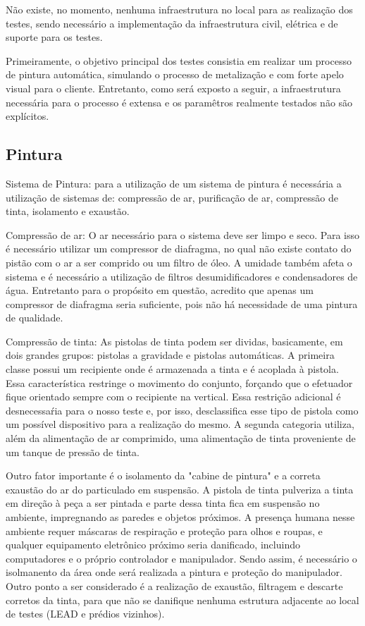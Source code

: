 Não existe, no momento, nenhuma infraestrutura no local para as
realização dos testes, sendo necessário a implementação da infraestrutura civil,
elétrica e de suporte para os testes.

Primeiramente, o objetivo principal dos testes consistia em realizar um processo
de pintura automática, simulando o processo de metalização e com forte apelo
visual para o cliente. Entretanto, como será exposto a seguir, a infraestrutura
necessária para o processo é extensa e os paramêtros realmente testados não são
explícitos.

\subsection{Pintura}

Sistema de Pintura: para a utilização de um sistema de pintura é necessária a utilização de sistemas de: 
compressão de ar, purificação de ar, compressão de tinta, isolamento e exaustão.

Compressão de ar: O ar necessário para o sistema deve ser limpo e seco. Para isso é necessário utilizar 
um compressor de diafragma, no qual não existe contato do pistão com o ar a ser comprido ou um filtro de 
óleo. A umidade também afeta o sistema e é necessário a utilização de filtros desumidificadores e condensadores 
de água. Entretanto para o propósito em questão, acredito que apenas um compressor de diafragma seria suficiente, 
pois não há necessidade de uma pintura de qualidade.

Compressão de tinta: As pistolas de tinta podem ser dividas, basicamente, em dois grandes grupos: pistolas a 
gravidade e pistolas automáticas. A primeira classe possui um recipiente onde é
armazenada a tinta e é acoplada à pistola. Essa característica restringe o
movimento do conjunto, forçando que o efetuador fique orientado sempre com o
recipiente na vertical. Essa restrição adicional é desnecessaŕia para o nosso teste e, por isso, desclassifica esse tipo de pistola como um possível dispositivo para a realização do mesmo. A segunda 
categoria utiliza, além da alimentação de ar comprimido, uma alimentação de tinta proveniente de um 
tanque de pressão de tinta.

Outro fator importante é o isolamento da "cabine de pintura" e a correta exaustão do ar do particulado em 
suspensão. A pistola de tinta pulveriza a tinta em direção à peça a ser pintada e parte dessa tinta fica 
em suspensão no ambiente, impregnando as paredes e objetos próximos. A presença humana nesse ambiente requer 
máscaras de respiração e proteção para olhos e roupas, e qualquer equipamento
eletrônico próximo seria danificado, incluindo computadores e o próprio
controlador e manipulador. Sendo assim, é necessário o isolmanento da
área onde será realizada a pintura e proteção do manipulador. Outro ponto a ser
considerado  é a realização de exaustão, filtragem e
descarte corretos da tinta, para que não se danifique nenhuma estrutura
adjacente ao local de testes (LEAD e prédios vizinhos).

